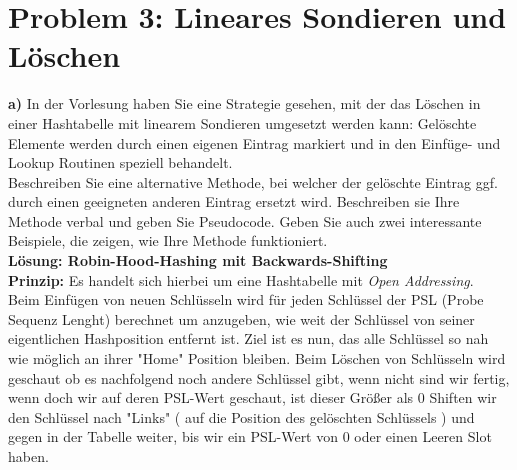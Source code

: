 
\lstset{style=mystyle}

\section*{Problem 3: Lineares Sondieren und Löschen} 


\noindent
\textbf{a)} In der Vorlesung haben Sie eine Strategie gesehen, mit der das Löschen in einer Hashtabelle mit linearem Sondieren umgesetzt werden kann: Gelöschte Elemente werden durch einen eigenen Eintrag markiert und in den Einfüge- und Lookup Routinen speziell behandelt.\\
Beschreiben Sie eine alternative Methode, bei welcher der gelöschte Eintrag ggf. durch einen geeigneten anderen Eintrag ersetzt wird. Beschreiben sie Ihre Methode verbal und geben Sie Pseudocode. Geben Sie auch zwei interessante Beispiele, die zeigen, wie Ihre Methode funktioniert.\\

\noindent
\textbf{Lösung: Robin-Hood-Hashing mit Backwards-Shifting}\\

\textbf{Prinzip:} Es handelt sich hierbei um eine Hashtabelle mit \textit{Open Addressing}.\\
Beim Einfügen von neuen Schlüsseln wird für jeden Schlüssel der PSL (Probe Sequenz Lenght) berechnet um anzugeben, wie weit der Schlüssel von seiner eigentlichen Hashposition entfernt ist. Ziel ist es nun, das alle Schlüssel so nah wie möglich an ihrer "Home" Position bleiben. Beim Löschen von Schlüsseln wird geschaut ob es nachfolgend noch andere Schlüssel gibt, wenn nicht sind wir fertig, wenn doch wir auf deren PSL-Wert geschaut, ist dieser Größer als 0 Shiften wir den Schlüssel nach "Links" ( auf die Position des gelöschten Schlüssels ) und gegen in der Tabelle weiter, bis wir ein PSL-Wert von 0 oder einen Leeren Slot haben.\\

